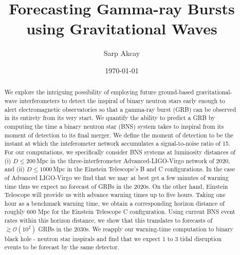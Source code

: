 \documentclass[prd,amsmath,amssymb,aps,floats,amsfonts,notitlepage,superscriptaddress,eqsecnum,nofootinbib,10pt]{revtex4-1}
\newcommand{\ord}{\mathcal{O}}
\begin{document}
\title{Forecasting Gamma-ray Bursts using Gravitational Waves}

\author{Sarp Akcay}

\date{\today}

\begin{abstract}
We explore the intriguing possibility of employing future ground-based gravitational-wave interferometers to detect the inspiral of binary neutron stars early enough to alert electromagnetic observatories so that a gamma-ray burst (GRB) can be observed in its entirety from its very start.
We quantify the ability to predict a GRB by computing the time a binary neutron star (BNS) system takes to inspiral from its moment of detection to its final merger. We define the moment of detection to be the instant at which the inteferometer network accumulates a signal-to-noise ratio of 15. %
For our computations, %
we specifically consider BNS systems at luminosity distances of (i) $D\le200\,$Mpc in the three-interferometer Advanced-LIGO-Virgo network of 2020, and (ii) $D \le 1000\,$Mpc in the Einstein Telescope's B and C configurations. 
In the case of Advanced LIGO-Virgo we find that we may at best get a few minutes of warning time thus we expect no forecast of GRBs in the 2020s. 
On the other hand, Einstein Telescope will provide us with advance warning times up to five hours.  
Taking one hour as a benchmark warning time, we obtain a corresponding horizon
distance of roughly 600 Mpc for the Einstein Telescope C configuration.
Using current BNS event rates within this horizon distance, we show that this translates to forecasts of $\gtrsim \ord(10^2)$ GRBs in the 2030s. %
We reapply our warning-time computation to binary black hole - neutron star inspirals and find that we expect 1 to 3 tidal disruption events 
to be forecast by the same detector.

\end{abstract}
\maketitle
\end{document}
